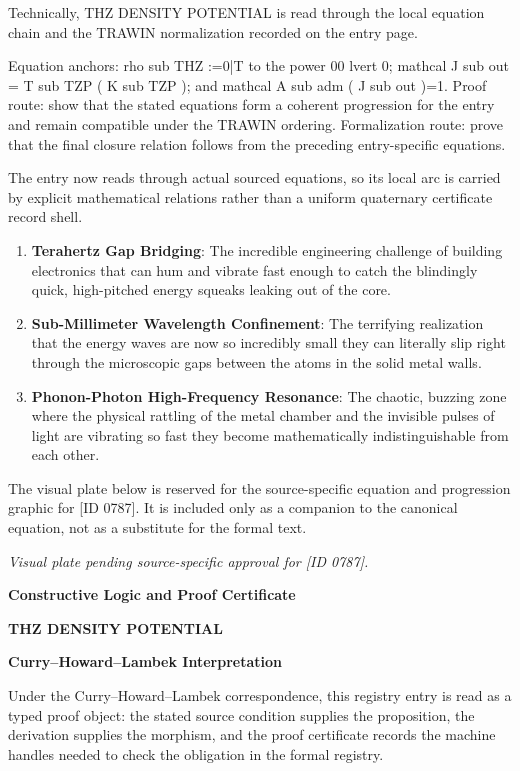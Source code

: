 Technically, THZ DENSITY POTENTIAL is read through the local equation chain and the TRAWIN normalization recorded on the entry page.

Equation anchors: rho sub THZ :=0|T to the power 00 lvert 0; mathcal J sub out = T sub TZP ( K sub TZP ); and mathcal A sub adm ( J sub out )=1. Proof route: show that the stated equations form a coherent progression for the entry and remain compatible under the TRAWIN ordering. Formalization route: prove that the final closure relation follows from the preceding entry-specific equations.

The entry now reads through actual sourced equations, so its local arc is carried by explicit mathematical relations rather than a uniform quaternary certificate record shell.
\endgroup

\begin{enumerate}[leftmargin=1.6em,itemsep=6pt,topsep=4pt]
\item \textbf{Terahertz Gap Bridging}: The incredible engineering challenge of building electronics that can hum and vibrate fast enough to catch the blindingly quick, high-pitched energy squeaks leaking out of the core.
\item \textbf{Sub-Millimeter Wavelength Confinement}: The terrifying realization that the energy waves are now so incredibly small they can literally slip right through the microscopic gaps between the atoms in the solid metal walls.
\item \textbf{Phonon-Photon High-Frequency Resonance}: The chaotic, buzzing zone where the physical rattling of the metal chamber and the invisible pulses of light are vibrating so fast they become mathematically indistinguishable from each other.
\end{enumerate}

\begingroup\footnotesize\sloppy
The visual plate below is reserved for the source-specific equation and progression graphic for [ID 0787]. It is included only as a companion to the canonical equation, not as a substitute for the formal text.
\par\endgroup
\begingroup\footnotesize\itshape
Visual plate pending source-specific approval for [ID 0787].
\par\endgroup

\clearpage
\begingroup\tzpsupportsetup
\noindent\textbf{\fontsize{10.8pt}{12.8pt}\selectfont [ID 0787] Constructive Logic and Proof Certificate}\par
\noindent\textbf{\fontsize{10pt}{12pt}\selectfont THZ DENSITY POTENTIAL}\par
\vspace{0.45em}
\begingroup
\footnotesize
\setlength{\parskip}{0.22em}
\setlength{\parindent}{0pt}
\noindent\textbf{Curry--Howard--Lambek Interpretation}\par
Under the Curry--Howard--Lambek correspondence, this registry entry is read as a typed proof
object: the stated source condition supplies the proposition, the derivation supplies the
morphism, and the proof certificate records the machine handles needed to check the obligation
in the formal registry.


